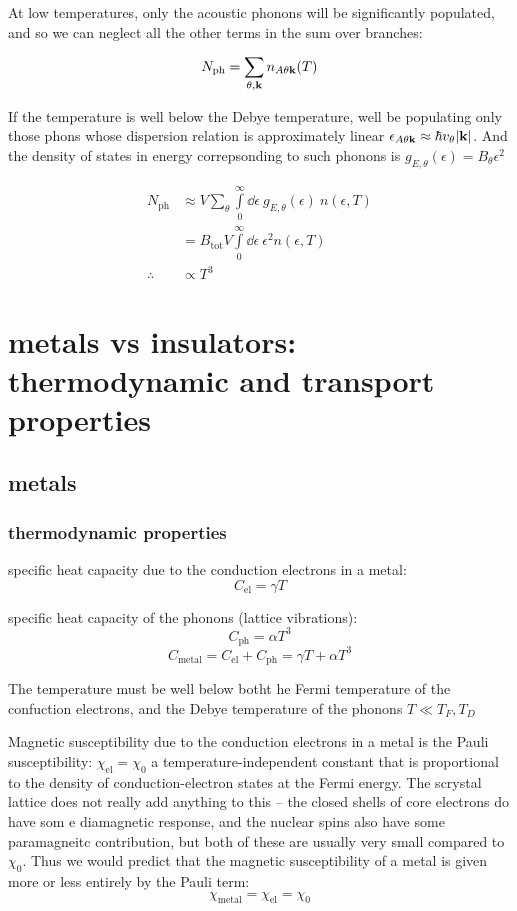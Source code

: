 \documentclass[10pt, a4paper, twocolumn]{article}
\begin{document}
At low temperatures, only the acoustic phonons will be significantly populated, and so we can neglect all the other terms in the sum over branches:

\[N_\mathrm{ph} = \sum _{\theta,\vb k}
n_{A\theta\vb k}(T)\]

If the temperature is well below the Debye temperature, well be populating only those phons whose dispersion relation is approximately linear
$\epsilon _{A\theta\vb k}
\approx \hbar v_\theta \abs{\vb k}$. And the density of states in energy correpsonding to such phonons is
$g_{E,\theta}(\epsilon)=B_\theta\epsilon ^2$

\begin{equation*}
\begin{aligned}
N_\mathrm{ph} &\approx V\sum _\theta\int\limits_0^\infty
\dd \epsilon\ g_{E,\theta}(\epsilon)\ n(\epsilon ,T)
\\&= B_\mathrm{tot}V\int\limits_0^\infty
\dd \epsilon\ \epsilon ^2 n(\epsilon, T)
\\ \therefore & \propto T^3
\end{aligned}
\end{equation*}

\section{metals vs insulators: thermodynamic and transport properties}
\subsection{metals}
\subsubsection{thermodynamic properties}

specific heat capacity due to the conduction electrons in a metal:
\[C_\mathrm{el}=\gamma T\]

specific heat capacity of the phonons (lattice vibrations):
\[C_\mathrm{ph}=\alpha T^3\]
\[C_\mathrm{metal}=C_\mathrm{el}+C_\mathrm{ph}
=\gamma T + \alpha T^3\]

The temperature must be well below botht he Fermi temperature of the confuction electrons, and the Debye temperature of the phonons
$T\ll T_F,T_D$

Magnetic susceptibility due to the conduction electrons in a metal is the Pauli susceptibility:
$\chi _\mathrm{el}=\chi _0$
a temperature-independent constant that is proportional to the density of conduction-electron states at the Fermi energy. The scrystal lattice does not really add anything to this -- the closed shells of core electrons do have  som e diamagnetic response, and the nuclear spins also have some paramagneitc contribution, but both of these are usually very small compared to $\chi _0$. Thus we would predict that the magnetic susceptibility of a metal is given more or less entirely by the Pauli term:
\[\chi _\mathrm{metal}=\chi _\mathrm{el} =\chi _0\]
\end{document}
